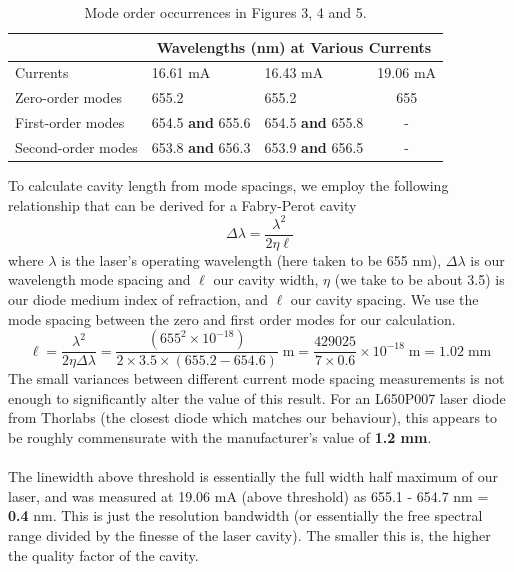 \documentclass[10pt,a4paper]{article}
\begin{document}
\begin{table}[H]
\centering
\begin{tabular}{|p{3cm}|p{2cm}|p{2cm}|c|}
\hline
& \multicolumn{3}{c|}{Wavelengths (nm) at Various Currents}
\\
\hline
Currents & 16.61 mA & 16.43 mA & 19.06 mA  \\ 
\hline 
Zero-order modes & 655.2 & 655.2 & 655 \\ 
\hline 
First-order modes & 654.5 \textbf{and} 655.6 & 654.5 \textbf{and} 655.8 & - \\
\hline
Second-order modes & 653.8 \textbf{and} 656.3 & 653.9 \textbf{and} 656.5 & - \\
\hline
\end{tabular} 
\caption{Mode order occurrences in Figures 3, 4 and 5.}
\end{table}
\noindent To calculate cavity length from mode spacings, we employ the following relationship that can be derived for a Fabry-Perot cavity
$$ \Delta \lambda = \dfrac{\lambda^{2}}{2\eta\ell}$$
where $\lambda$ is the laser's operating wavelength (here taken to be 655 nm), $\Delta \lambda$ is our wavelength mode spacing and $\ell$ our cavity width, $\eta$ (we take to be about 3.5) is our diode medium index of refraction, and $\ell$ our cavity spacing. We use the mode spacing between the zero and first order modes for our calculation.
$$ \ell = \dfrac{\lambda^{2}}{2\eta\Delta\lambda} = \dfrac{\left(655^{2} \times 10^{-18}\right)}{2\times 3.5 \times (655.2 - 654.6)} \; \mathrm{m} = \dfrac{429025}{7\times 0.6} \times 10^{-18} \; \mathrm{m} = \mathbf{1.02}\; \mathrm{mm}$$
The small variances between different current mode spacing measurements is not enough to significantly alter the value of this result. For an L650P007 laser diode from Thorlabs (the closest diode which matches our behaviour), this appears to be roughly commensurate with the manufacturer's value of \textbf{1.2 mm}.\\
\\
The linewidth above threshold is essentially the full width half maximum of our laser, and was measured at 19.06 mA (above threshold) as 655.1 - 654.7 nm = \textbf{0.4} nm. This is just the resolution bandwidth (or essentially the free spectral range divided by the finesse of the laser cavity). The smaller this is, the higher the quality factor of the cavity.
\end{document}
